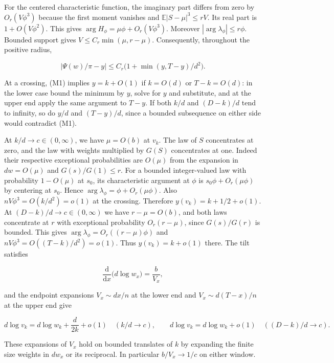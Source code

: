 For the centered characteristic function, the imaginary part differs from zero by $O_r(V\phi^3)$ because the first moment vanishes and $\mathbb E|S-\mu|^3\le r V$. Its real part is $1+O(V\phi^2)$. This gives $\arg H_\phi=\mu\phi+O_r(V\phi^3)$. Moreover $|\arg\lambda_\phi|\le r\phi$. Bounded support gives $V\le C_r\min(\mu,r-\mu)$. Consequently, throughout the positive radius,

\begin{equation}
|\Psi(w)/\pi-y|\le C_r\big(1+\min(y,T-y)/d^2\big).
\tag{M1}
\end{equation}

At a crossing, (M1) implies $y=k+O(1)$ if $k=O(d)$ or $T-k=O(d)$: in the lower case bound the minimum by $y$, solve for $y$ and substitute, and at the upper end apply the same argument to $T-y$. If both $k/d$ and $(D-k)/d$ tend to infinity, so do $y/d$ and $(T-y)/d$, since a bounded subsequence on either side would contradict (M1).

At $k/d\to c\in(0,\infty)$, we have $\mu=O(b)$ at $v_k$. The law of $S$ concentrates at zero, and the law with weights multiplied by $G(S)$ concentrates at one. Indeed their respective exceptional probabilities are $O(\mu)$ from the expansion in $dw=O(\mu)$ and $G(s)/G(1)\le r$. For a bounded integer-valued law with probability $1-O(\mu)$ at $s_0$, its characteristic argument at $\phi$ is $s_0\phi+O_r(\mu\phi)$ by centering at $s_0$. Hence $\arg\lambda_\phi=\phi+O_r(\mu\phi)$. Also $nV\phi^3=O(k/d^2)=o(1)$ at the crossing. Therefore $y(v_k)=k+1/2+o(1)$. At $(D-k)/d\to c\in(0,\infty)$ we have $r-\mu=O(b)$, and both laws concentrate at $r$ with exceptional probability $O_r(r-\mu)$, since $G(s)/G(r)$ is bounded. This gives $\arg\lambda_\phi=O_r((r-\mu)\phi)$ and $nV\phi^3=O((T-k)/d^2)=o(1)$. Thus $y(v_k)=k+o(1)$ there. The tilt satisfies

\begin{equation*}
\frac{\mathrm d}{\mathrm dx}\big(d\log w_x\big)=\frac{b}{V_x},
\end{equation*}

and the endpoint expansions $V_x\sim dx/n$ at the lower end and $V_x\sim d(T-x)/n$ at the upper end give

\begin{equation}
d\log v_k=d\log w_k+\frac{d}{2k}+o(1)\quad(k/d\to c),
\qquad d\log v_k=d\log w_k+o(1)\quad((D-k)/d\to c).
\tag{M2}
\end{equation}

These expansions of $V_x$ hold on bounded translates of $k$ by expanding the finite size weights in $dw_x$ or its reciprocal. In particular $b/V_x\to1/c$ on either window.

